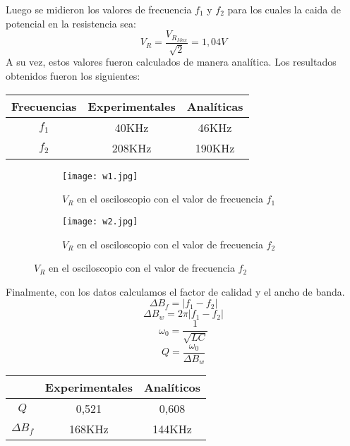 \documentclass[a4paper,12pt]{article}
\begin{document}
\hspace{1cm} Luego se midieron los valores de frecuencia $f_1$ y $f_2$ para los cuales la caida de potencial en la resistencia sea:
\[V_R = \frac{V_{R_{Max}}}{\sqrt{2}} = 1,04V \]
A su vez, estos valores fueron calculados de manera analítica. Los resultados obtenidos fueron los siguientes: 
\begin{table}[H]
    \centering
    \begin{tabular}{|c|c|c|} %
      \hline
      Frecuencias & Experimentales & Analíticas \\
      \hline
      $f_1$ & 40KHz & 46KHz \\
      \hline
      $f_2$ & 208KHz & 190KHz \\
      \hline
    \end{tabular}
    \label{tabla:ejemplo}
\end{table}

\begin{figure}[h!]
    \centering
    \begin{subfigure}{0.45\textwidth}
        \centering
        \texttt{[image: w1.jpg]}
        \caption{$V_R$ en el osciloscopio con el valor de frecuencia $f_1$}
    \end{subfigure}
    \hspace{0.5cm}
    \begin{subfigure}{0.45\textwidth}
        \centering
        \texttt{[image: w2.jpg]}
        \caption{$V_R$ en el osciloscopio con el valor de frecuencia $f_2$}
    \end{subfigure}
\end{figure}

Finalmente, con los datos calculamos el factor de calidad y el ancho de banda.
\[ \Delta B_f = |f_1 - f_2|\]
\[ \Delta B_w = 2\pi|f_1 - f_2|\]
\[ \omega_0 = \frac{1}{\sqrt{LC}}\]
\[ Q = \frac{\omega_0}{\Delta B_w} \]

\begin{table}[h!]
    \centering
    \begin{tabular}{|c|c|c|} %
      \hline
      \ & Experimentales & Analíticos \\
      \hline
      $Q$ & 0,521 & 0,608 \\
      \hline
      $\Delta B_f$ & 168KHz & 144KHz \\
      \hline
    \end{tabular}
    \label{tabla:ejemplo}
\end{table}
\end{document}
